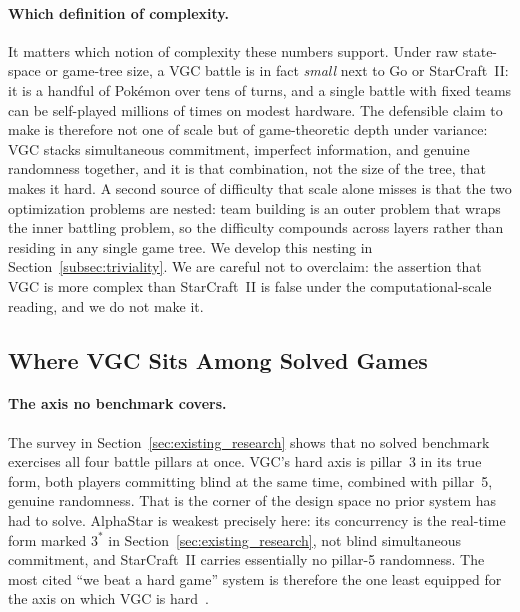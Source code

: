\paragraph{Which definition of complexity.}
It matters which notion of complexity these numbers support. Under raw
state-space or game-tree size, a VGC battle is in fact \emph{small} next to Go or
StarCraft~II: it is a handful of Pok\'{e}mon over tens of turns, and a single
battle with fixed teams can be self-played millions of times on modest hardware.
The defensible claim to make is therefore not one of scale but of game-theoretic
depth under variance: VGC stacks simultaneous commitment, imperfect information,
and genuine randomness together, and it is that combination, not the size of the
tree, that makes it hard. A second source of difficulty that scale alone misses is
that the two optimization problems are nested: team building is an outer problem
that wraps the inner battling problem, so the difficulty compounds across layers
rather than residing in any single game tree. We develop this nesting in
Section~\ref{subsec:triviality}. We are careful not to overclaim: the assertion
that VGC is more complex than StarCraft~II is false under the computational-scale
reading, and we do not make it.

\subsection{Where VGC Sits Among Solved Games}
\label{subsec:positioning}
\paragraph{The axis no benchmark covers.}
The survey in Section~\ref{sec:existing_research} shows that no solved benchmark
exercises all four battle pillars at once. VGC's hard axis is pillar~3 in its
true form, both players committing blind at the same time, combined with pillar~5,
genuine randomness. That is the corner of the design space no prior system has
had to solve. AlphaStar is weakest precisely here: its concurrency is the
real-time form marked $3^{*}$ in Section~\ref{sec:existing_research}, not blind
simultaneous commitment, and StarCraft~II carries essentially no pillar-5
randomness. The most cited ``we beat a hard game'' system is therefore the one
least equipped for the axis on which VGC is hard~\cite{vinyals2019alphastar}.

